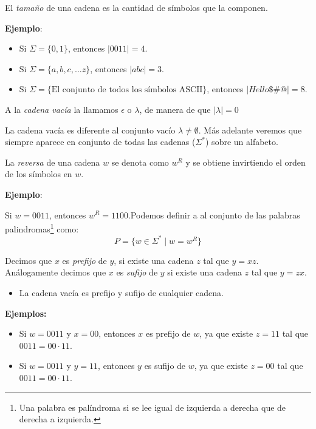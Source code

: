\begin{Def}
El \textit{tamaño} de una cadena es la cantidad de símbolos que la componen.
\end{Def}

\textbf{Ejemplo}:

\begin{itemize}
    \item Si $\Sigma = \{0,1\}$, entonces $|0011| = 4$.
    \item Si $\Sigma = \{a,b,c, \ldots z\}$, entonces $|abc| = 3$.
    \item Si $\Sigma = \{\text{El conjunto de todos los símbolos ASCII} \}$, entonces $|Hello\$\#@| = 8$.
\end{itemize}

\begin{Def}
A la \textit{cadena vacía} la llamamos $\epsilon$  o $\lambda$, de manera de que $|\lambda| = 0$
\end{Def}

La cadena vacía es diferente al conjunto vacío $\lambda \neq \emptyset$. Más adelante veremos que siempre aparece en conjunto de todas las cadenas ($\Sigma^*$) sobre un alfabeto.

\begin{Def}
La \textit{reversa} de una cadena $w$ se denota como $w^R$ y se obtiene invirtiendo el orden de los símbolos en $w$.
\end{Def}

\textbf{Ejemplo}:

Si $w = 0011$, entonces $w^R = 1100$.Podemos definir a al conjunto de las palabras palindromas\footnote{Una palabra es palíndroma si se lee igual de izquierda a derecha que de derecha a izquierda.} 
como: $$P = \{ w \in \Sigma^* \mid w = w^R \}$$

\begin{Def}
Decimos que $x$ es \textit{prefijo} de $y$,  si existe una cadena $z$ tal que $y = xz$. 
Análogamente decimos que $x$ es \textit{sufijo} de $y$ si existe una cadena $z$ tal que $y = zx$.
\begin{itemize}
\item La cadena vacía es prefijo y sufijo de cualquier cadena.
\end{itemize}
\end{Def}
\textbf{Ejemplos:}

\begin{itemize}
    \item Si $w = 0011$ y $x = 00$, entonces $x$ es prefijo de $w$, ya que existe $z = 11$ tal que $0011 = 00 \cdot 11$.
    \item Si $w = 0011$ y $y = 11$, entonces $y$ es sufijo de $w$, ya que existe $z = 00$ tal que $0011 = 00 \cdot 11$.
\end{itemize}
